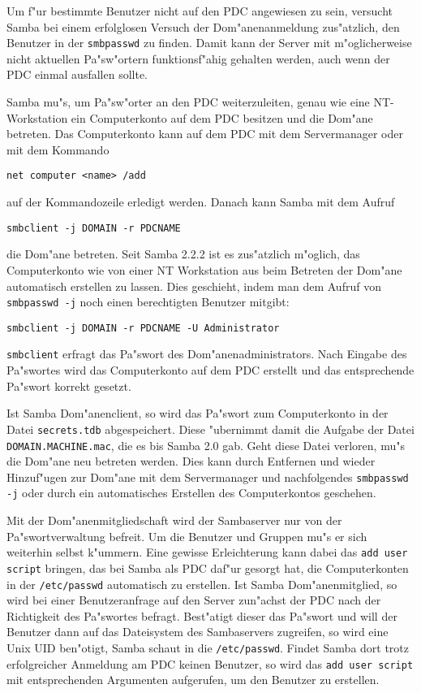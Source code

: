 \documentclass{scrartcl}\usepackage{pslatex}\typearea{12}
\newcommand{\prog}{\texttt}
\newcommand{\param}{\texttt}
\newcommand{\dateistyle}{\texttt}
\newcommand{\todo}[1]{}
\begin{document}
Um f"ur bestimmte Benutzer nicht auf den PDC angewiesen zu sein,
versucht Samba bei einem erfolglosen Versuch der Dom"anenanmeldung
zus"atzlich, den Benutzer in der \dateistyle{smbpasswd} zu finden.
Damit kann der Server mit m"oglicherweise nicht aktuellen Pa"sw"ortern
funktionsf"ahig gehalten werden, auch wenn der PDC einmal ausfallen
sollte.

Samba mu"s, um Pa"sw"orter an den PDC weiterzuleiten, genau wie eine
NT-Workstation ein Computerkonto auf dem PDC besitzen und die Dom"ane
betreten. Das Computerkonto kann auf dem PDC mit dem Servermanager
oder mit dem Kommando

\begin{verbatim}
net computer <name> /add
\end{verbatim}

auf der Kommandozeile erledigt werden. Danach kann Samba mit dem
Aufruf

\begin{verbatim}
smbclient -j DOMAIN -r PDCNAME
\end{verbatim}

die Dom"ane betreten. Seit Samba 2.2.2 ist es zus"atzlich m"oglich,
das Computerkonto wie von einer NT Workstation aus beim Betreten der
Dom"ane automatisch erstellen zu lassen. Dies geschieht, indem man dem
Aufruf von \prog{smbpasswd -j} noch einen berechtigten Benutzer
mitgibt:

\begin{verbatim}
smbclient -j DOMAIN -r PDCNAME -U Administrator
\end{verbatim}

\prog{smbclient} erfragt das Pa"swort des Dom"anenadministrators. Nach
Eingabe des Pa"swortes wird das Computerkonto auf dem PDC erstellt und
das entsprechende Pa"swort korrekt gesetzt.

Ist Samba Dom"anenclient, so wird das Pa"swort zum Computerkonto in
der Datei \dateistyle{secrets.tdb} abgespeichert. Diese
"ubernimmt damit die Aufgabe der Datei
\dateistyle{DOMAIN.MACHINE.mac}, die es bis Samba 2.0 gab. Geht diese
Datei verloren, mu"s die Dom"ane neu betreten werden. Dies kann durch
Entfernen und wieder Hinzuf"ugen zur Dom"ane mit dem Servermanager und
nachfolgendes \prog{smbpasswd -j} oder durch ein automatisches
Erstellen des Computerkontos geschehen.

\todo{allow trusted domains}

Mit der Dom"anenmitgliedschaft wird der Sambaserver nur von der
Pa"swortverwaltung befreit. Um die Benutzer und Gruppen mu"s er sich
weiterhin selbst k"ummern. Eine gewisse Erleichterung kann dabei das
\param{add user script} bringen, das bei Samba als PDC daf"ur gesorgt
hat, die Computerkonten in der \param{/etc/passwd} automatisch zu
erstellen.  Ist Samba Dom"anenmitglied, so wird bei einer
Benutzeranfrage auf den Server zun"achst der PDC nach der Richtigkeit
des Pa"swortes befragt.  Best"atigt dieser das Pa"swort und will der
Benutzer dann auf das Dateisystem des Sambaservers zugreifen, so wird
eine Unix UID ben"otigt, Samba schaut in die \dateistyle{/etc/passwd}.
Findet Samba dort trotz erfolgreicher Anmeldung am PDC keinen
Benutzer, so wird das \param{add user script} mit entsprechenden
Argumenten aufgerufen, um den Benutzer zu erstellen.
\end{document}

